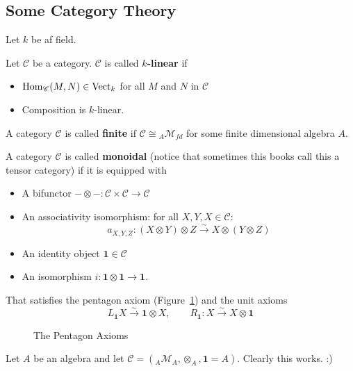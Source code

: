 \documentclass[12pt]{article}
\theoremstyle{break}
\theoremstyle{nonumberbreak}
\theoremstyle{changebreak}
\theoremstyle{break}
\theoremstyle{nonumberbreak}
\theoremstyle{nonumberplain}
\theoremstyle{change}
\DeclareMathOperator{\id}{id}
\newcommand*{\Hom}{\ensuremath\text{Hom}}
\newcommand*{\Vectk}{\operatorname{Vect}_k}
\newcommand*{\calM}{\mathcal{M}}
\begin{document}
\subsection{Some Category Theory}
Let $k$ be af field.
\begin{defn}
	Let $\mathscr C$ be a category. $\mathscr C$ is called \textbf{$k$-linear} if
	\begin{itemize}
		\item $\Hom_{\mathscr C}(M,N)\in\Vectk$ for all $M$ and $N$ in $\mathscr C$
		\item Composition is $k$-linear.
	\end{itemize}
\end{defn}
\begin{defn}
	A category $\mathscr C$ is called \textbf{finite} if $\mathscr C\cong {_A\calM_{fd}}$ 
	for some finite dimensional algebra $A$.
\end{defn}
\begin{defn}
	A category $\mathscr C$ is called \textbf{monoidal} (notice that sometimes this books 
	call this a tensor category) if it is equipped with
	\begin{itemize}
		\item A bifunctor $-\otimes -:\mathscr C\times\mathscr C\to \mathscr C$
		\item An associativity isomorphism: for all $X,Y,X\in\mathscr C$:
		\[a_{X,Y,Z}:(X\otimes Y)\otimes Z\xrightarrow{\sim} X\otimes(Y\otimes Z)\]
		\item An identity object $\mathbf{1}\in\mathscr{C}$
		\item An isomorphism $i:\mathbf{1}\otimes\mathbf{1}\to \mathbf{1}.$
	\end{itemize}
	That satisfies the pentagon axiom (Figure~\ref{fig:pentagon}) and the unit axioms
	\[L_\mathbf{1}X\xrightarrow{\sim} \mathbf{1}\otimes X,\qquad R_\mathbf{1}:X\xrightarrow{\sim}X\otimes \mathbf{1}\]
\end{defn}
\begin{figure}\label{fig:pentagon}
	\centering
	\caption{The Pentagon Axioms}
\end{figure}
\begin{ex}
	Let $A$ be an algebra and let $\mathscr C= ({_A\calM_A},\otimes_A,\mathbf{1}=A)$.
	Clearly this works. :)
\end{ex}
\end{document}
